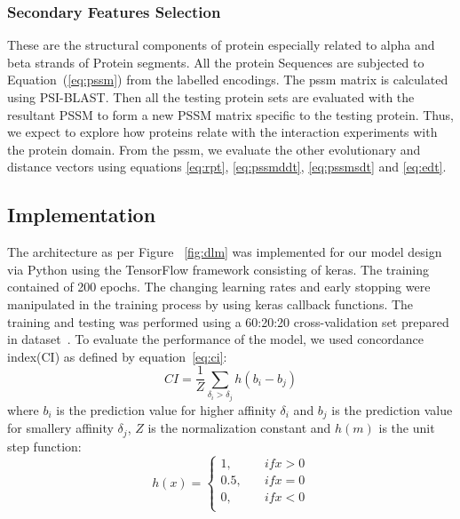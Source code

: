 \subsubsection{Secondary Features Selection}
These are the structural components of protein especially related to alpha and beta strands of Protein segments. All the protein Sequences are subjected to Equation~(\ref{eq:pssm}) from the labelled encodings. The \acrshort{pssm} matrix is calculated using PSI-BLAST\citep{Schaffer2001}. Then all the testing protein sets are evaluated with the resultant PSSM to form a new PSSM matrix specific to the testing protein. Thus, we expect to explore how proteins relate with the interaction experiments with the protein domain. From the \acrshort{pssm}, we evaluate the other evolutionary and distance vectors using equations \ref{eq:rpt}, \ref{eq:pssmddt}, \ref{eq:pssmsdt} and \ref{eq:edt}.

\subsection{Implementation}


The architecture as per Figure ~\ref{fig:dlm} was implemented for our model design via Python using the TensorFlow framework consisting of keras. The training contained of 200 epochs. The changing learning rates and early stopping were manipulated in the training process by using keras callback functions. The training and testing was performed using a 60:20:20 cross-validation set prepared in dataset~\cite{He2017}. To evaluate the performance of the model, we used concordance index(CI)\citep{Xu2015} as defined by equation~\ref{eq:ci}:
\begin{equation}
    CI = \frac{1}{Z} \sum_{\delta_i > \delta_j} h(b_i - b_j)
    \label{eq:ci}
\end{equation}
where $b_i$ is the prediction value for higher affinity $\delta_i$ and $b_j$ is the prediction value for smallery affinity $\delta_j$, $Z$ is the normalization constant and $h(m)$ is the unit step function:
\begin{equation} h(x) = 
    \begin{cases}
        1,& \quad {if x>0} \\
        0.5, & \quad{ if x=0 } \\
        0, & \quad{if x<0} \\
    \end{cases}
\end{equation}

